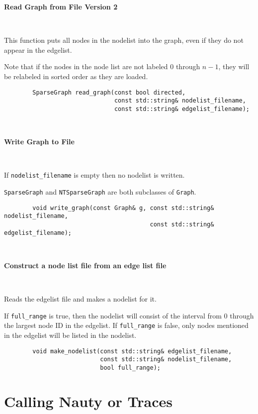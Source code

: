 \documentclass{article}
\begin{document}
\newpage

\textbf{Read Graph from File Version 2}

\ 

This function puts all nodes in the nodelist into the graph, even if they do not appear in the edgelist.

Note that if the nodes in the node list are not labeled 0 through $n-1$, they will be relabeled in sorted order as they are loaded.

\begin{verbatim}
        SparseGraph read_graph(const bool directed,
                               const std::string& nodelist_filename,
                               const std::string& edgelist_filename);
\end{verbatim}

\ 

\textbf{Write Graph to File}

\ 

If \verb|nodelist_filename| is empty then no nodelist is written.

\verb|SparseGraph| and \verb|NTSparseGraph| are both subclasses of \verb|Graph|.

\begin{verbatim}
        void write_graph(const Graph& g, const std::string& nodelist_filename,
                                         const std::string& edgelist_filename);
\end{verbatim}

\ 

\textbf{Construct a node list file from an edge list file}

\ 

Reads the edgelist file and makes a nodelist for it.

If \verb|full_range| is true, then the nodelist will consist of the interval from 0 through the largest node ID in the edgelist. If \verb|full_range| is false, only nodes mentioned in the edgelist will be listed in the nodelist.

\begin{verbatim}
        void make_nodelist(const std::string& edgelist_filename,
                           const std::string& nodelist_filename,
                           bool full_range);
\end{verbatim}

\newpage

\section{Calling Nauty or Traces}\label{sec:calling}
\end{document}
